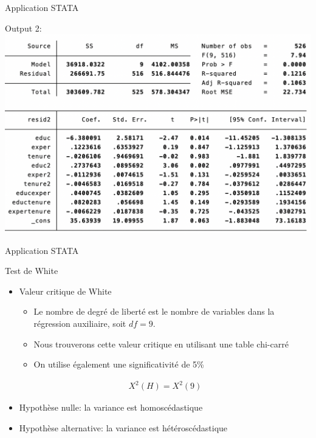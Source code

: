 \documentclass{beamer}
\begin{document}
\begin{frame}{Application STATA}
\begin{block}{Output 2:}
\includegraphics[scale=.5]{aux1.png}
\end{block}
\end{frame}


\begin{frame}{Application STATA}
\begin{block}{Test de White}
\begin{itemize}
\item Valeur critique de White
\begin{itemize}
\item Le nombre de degré de liberté est le nombre de variables dans la régression auxiliaire, soit $df=9$.
\item Nous trouverons cette valeur critique en utilisant une table chi-carré
\item On utilise également une significativité de 5\%
\end{itemize}
\begin{align*}
X^2(H)=X^2(9)
\end{align*}
\item Hypothèse nulle: la variance est homoscédastique
\item Hypothèse alternative: la variance est hétéroscédastique
\end{itemize}
\end{block}

\end{frame}
\end{document}
